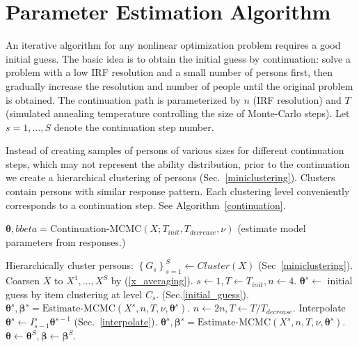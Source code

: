 \documentclass{article}
\newcommand{\ta}{\theta}
\newcommand{\bbeta}{\boldsymbol\beta}
\newcommand{\bta}{\boldsymbol\ta}
\newcommand{\lla}{\longleftarrow}
\begin{document}
\section{Parameter Estimation Algorithm}
An iterative algorithm for any nonlinear optimization problem requires a good initial guess. The basic idea is to obtain the initial guess by continuation: solve a problem with a low IRF resolution and a small number of persons first, then gradually increase the resolution and number of people until the original problem is obtained. The continuation path is parameterized by $n$ (IRF resolution) and $T$ (simulated annealing temperature controlling the size of Monte-Carlo steps). Let $s=1,\dots,S$ denote the continuation step number.

Instead of creating samples of persons of various sizes for different continuation steps, which may not represent the ability distribution, prior to the continuation we create a hierarchical clustering of persons (Sec.~\ref{miniclustering}). Clusters contain persons with similar response pattern. Each clustering level conveniently corresponds to a continuation step. See Algorithm~\ref{continuation}.

\begin{algorithm}
	\label{continuation}
	\caption{$\bta, bbeta = {\mbox{Continuation-MCMC}}(X; T_{init}, T_{decrease}, \nu)$
(estimate model parameters from responses.)}
	\begin{algorithmic}
    \STATE Hierarchically cluster persons: $\left\{G_s\right\}_{s=1}^S \lla Cluster(X)$ (Sec~\ref{miniclustering}).
    \STATE Coarsen $X$ to $X^1,\dots,X^S$ by (\ref{x_averaging}).
    \STATE $s \lla 1, T \lla T_{init}, n \lla 4$.
    \STATE $\bta^s \lla$ initial guess by item clustering at level $C_s$. (Sec.\ref{initial_guess}).
    \STATE $\bta^s, \bbeta^s = {\mbox{Estimate-MCMC}}(X^s, n, T, \nu, \bta^s)$.
    	\STATE $n \lla 2 n, T \lla T / T_{decrease}$.
    	\STATE Interpolate $\bta^s \lla I_{s-1}^s \bta^{s-1}$ (Sec.~\ref{interpolate}). 
	    \STATE $\bta^s, \bbeta^s = {\mbox{Estimate-MCMC}}(X^s, n, T, \nu, \bta^s)$.
   	\ENDFOR
   	\STATE $\bta \lla \bta^S, \bbeta \lla \bbeta^S$.
	\end{algorithmic}
\end{algorithm}
\end{document}
